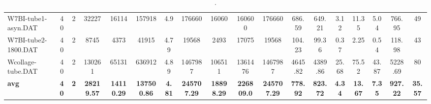 \begin{sidewaystable}[h]
{\begin{tabular}{lccccccccccccccccc}
W7BI-tube1-asyn.DAT & 40 & 2 & 32227 & 16114 & 157918 & 4.9 & 176660 & 16060 & 160600 & 176660 & 686.59 & 649.21 & 3.12 & 11.35 & 5.04 & 766.95 & 49\\
W7BI-tube2-1800.DAT & 40 & 2 & 8745 & 4373 & 41915 & 4.79 & 19568 & 2493 & 17075 & 19568 & 104.23 & 99.36 & 0.37 & 2.25 & 0.54 & 118.98 & 43\\
Wcollage-tube.DAT & 40 & 2 & 130261 & 65131 & 636912 & 4.89 & 1467987 & 106511 & 1361476 & 1467987 & 4645.82 & 4389.86 & 25.68 & 75.52 & 43.87 & 5228.69 & 80\\
\cline{1-18} \textbf{avg} & \textbf{40} & \textbf{2} & \textbf{28219.57} & \textbf{14110.29} & \textbf{137500.86} & \textbf{4.81} & \textbf{245707.29} & \textbf{18898.29} & \textbf{226809.0} & \textbf{245707.29} & \textbf{778.92} & \textbf{823.72} & \textbf{4.34} & \textbf{13.67} & \textbf{7.35} & \textbf{927.22} & \textbf{35.57} \\ \cline{1-18}
\bottomrule
\end{tabular}%
}%
\caption{.}
\label{tab:table_bc}
\end{sidewaystable}

